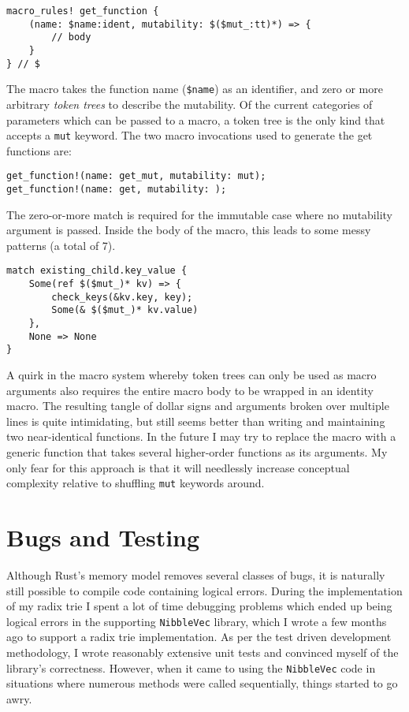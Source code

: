 \documentclass[a4paper,12pt]{article}
\newcommand{\code}{\texttt}
\begin{document}
\begin{verbatim}
macro_rules! get_function {
    (name: $name:ident, mutability: $($mut_:tt)*) => {
        // body
    }
} // $
\end{verbatim}

The macro takes the function name (\code{\$name}) as an identifier, and zero or more arbitrary \textit{token trees} to describe the mutability. Of the current categories of parameters which can be passed to a macro, a token tree is the only kind that accepts a \code{mut} keyword. The two macro invocations used to generate the get functions are:

\begin{verbatim}
get_function!(name: get_mut, mutability: mut);
get_function!(name: get, mutability: );
\end{verbatim}

The zero-or-more match is required for the immutable case where no mutability argument is passed. Inside the body of the macro, this leads to some messy patterns (a total of 7).

\begin{verbatim}
match existing_child.key_value {
    Some(ref $($mut_)* kv) => {
        check_keys(&kv.key, key);
        Some(& $($mut_)* kv.value)
    },
    None => None
}
\end{verbatim}

A quirk in the macro system whereby token trees can only be used as macro arguments also requires the entire macro body to be wrapped in an identity macro. The resulting tangle of dollar signs and arguments broken over multiple lines is quite intimidating, but still seems better than writing and maintaining two near-identical functions. In the future I may try to replace the macro with a generic function that takes several higher-order functions as its arguments. My only fear for this approach is that it will needlessly increase conceptual complexity relative to shuffling \code{mut} keywords around.

\section{Bugs and Testing}

Although Rust's memory model removes several classes of bugs, it is naturally still possible to compile code containing logical errors. During the implementation of my radix trie I spent a lot of time debugging problems which ended up being logical errors in the supporting \code{NibbleVec} library, which I wrote a few months ago to support a radix trie implementation. As per the test driven development methodology, I wrote reasonably extensive unit tests and convinced myself of the library's correctness. However, when it came to using the \code{NibbleVec} code in situations where numerous methods were called sequentially, things started to go awry.\\
\end{document}
